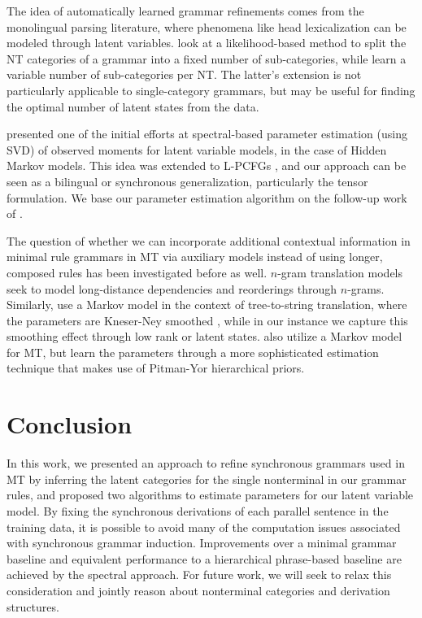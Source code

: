 \documentclass[11pt]{article}
\begin{document}
The idea of automatically learned grammar refinements comes from the monolingual parsing literature, where phenomena like head lexicalization can be modeled through latent variables.   look at a likelihood-based method to split the NT categories of a grammar into a fixed number of sub-categories, while  learn a variable number of sub-categories per NT.  The latter's extension is not particularly applicable to single-category grammars, but may be useful for finding the optimal number of latent states from the data.  

 presented one of the initial efforts at spectral-based parameter estimation (using SVD) of observed moments for latent variable models, in the case of Hidden Markov models. 
This idea was extended to L-PCFGs \cite{cohen-14b}, and our approach can be seen as a bilingual or synchronous generalization, particularly the tensor formulation.  
We base our parameter estimation algorithm on the follow-up work of .  

The question of whether we can incorporate additional contextual information in minimal rule grammars in MT via auxiliary models instead of using longer, composed rules has been investigated before as well.
$n$-gram translation models \cite{Marino2006,Durrani2011} seek to model long-distance dependencies and reorderings through $n$-grams.  
Similarly,  use a Markov model in the context of tree-to-string translation, where the parameters are Kneser-Ney smoothed \cite{Kneser1993}, while in our instance we capture this smoothing effect through low rank or latent states.    
 also utilize a Markov model for MT, but learn the parameters through a more sophisticated estimation technique that makes use of Pitman-Yor hierarchical priors. 

\section{Conclusion}
In this work, we presented an approach to refine synchronous grammars used in MT by inferring the latent categories for the single nonterminal in our grammar rules, and proposed two algorithms to estimate parameters for our latent variable model.  
By fixing the synchronous derivations of each parallel sentence in the training data, it is possible to avoid many of the computation issues associated with synchronous grammar induction. 
Improvements over a minimal grammar baseline and equivalent performance to a hierarchical phrase-based baseline are achieved by the spectral approach.   
For future work, we will seek to relax this consideration and jointly reason about nonterminal categories and derivation structures.



\end{document}
